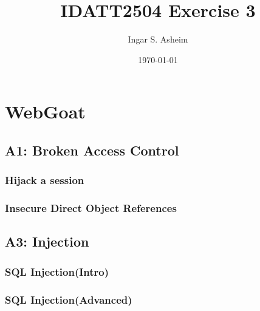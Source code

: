 \documentclass[11pt,a4paper]{report}
\title{IDATT2504 Exercise 3}
\author{Ingar S. Asheim}
\date{\today}
\begin{document}
\maketitle

\section{WebGoat}
\subsection{A1: Broken Access Control}
\subsubsection{Hijack a session}

\subsubsection{Insecure Direct Object References}

\subsection{A3: Injection}

\subsubsection{SQL Injection(Intro)}

\subsubsection{SQL Injection(Advanced)}
\end{document}
